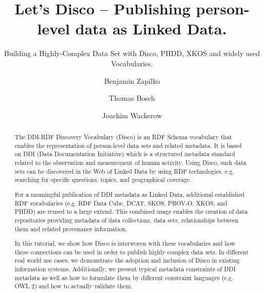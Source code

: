 \documentclass{llncs}
\begin{document}
%
%
\title{Let’s Disco – Publishing person-level data as Linked Data.}
\subtitle{Building a Highly-Complex Data Set with Disco, PHDD, XKOS and widely used Vocabularies.
}
%
%
\author{Benjamin Zapilko \and Thomas Bosch \and Joachim Wackerow}
%
%

\maketitle              %

\begin{abstract}
The DDI-RDF Discovery Vocabulary (Disco) is an RDF Schema vocabulary that enables the representation of person-level data sets and related metadata.
It is based on DDI (Data Documentation Initiative) which is a structured metadata standard related to the observation and measurement of human activity.
Using Disco, such data sets can be discovered in the Web of Linked Data by using RDF technologies, e.g. searching for specific questions, topics, and geographical coverage. 

For a meaningful publication of DDI metadata as Linked Data, additional established RDF vocabularies (e.g. RDF Data Cube, DCAT, SKOS, PROV-O, XKOS, and PHDD) are reused to a large extend. 
This combined usage enables the creation of data repositories providing metadata of data collections, data sets, relationships between them and related provenance information.
 
In this tutorial, we show how Disco is interwoven with these vocabularies and how these connections can be used in order to publish highly complex data sets.
In different real world use cases, we demonstrate the adoption and inclusion of Disco in existing information systems. 
Additionally, we present typical metadata constraints of DDI metadata as well as how to formulate them by different constraint languages (e.g. OWL 2) and how to actually validate them.

 

\end{abstract}
%
\end{document}
